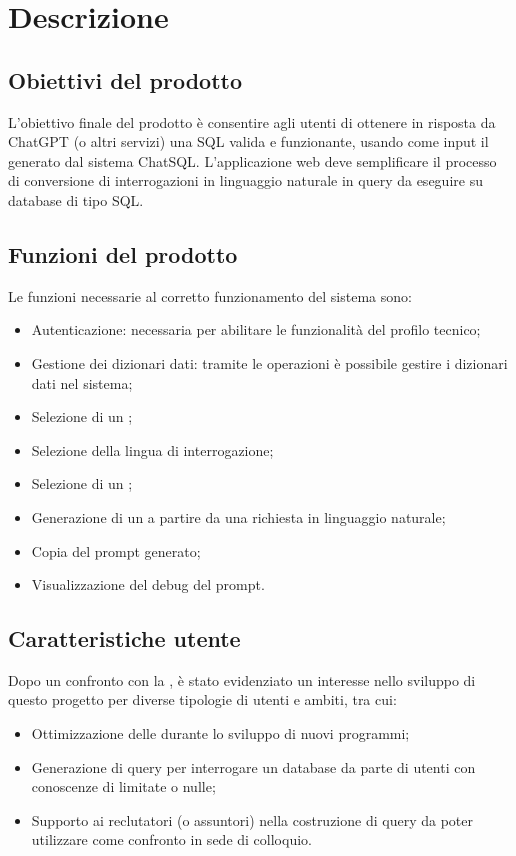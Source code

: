 \section{Descrizione}

\subsection{Obiettivi del prodotto}
\par L’obiettivo finale del prodotto è consentire agli utenti di ottenere in risposta da ChatGPT (o altri servizi) una  SQL valida e funzionante, usando come input il  generato dal sistema ChatSQL. L’applicazione web deve semplificare il processo di conversione di interrogazioni in linguaggio naturale in query da eseguire su database di tipo SQL.

\subsection{Funzioni del prodotto}
\par Le funzioni necessarie al corretto funzionamento del sistema sono:
\begin{itemize}
  \item Autenticazione: necessaria per abilitare le funzionalità del profilo tecnico;
  \item Gestione dei dizionari dati: tramite le operazioni  è possibile gestire i dizionari dati nel sistema;
  \item Selezione di un ;
  \item Selezione della lingua di interrogazione;
  \item Selezione di un ;
  \item Generazione di un  a partire da una richiesta in linguaggio naturale;
  \item Copia del prompt generato;
  \item Visualizzazione del debug del prompt.
\end{itemize}

\subsection{Caratteristiche utente}
Dopo un confronto con la , è stato evidenziato un interesse nello sviluppo di questo progetto per diverse tipologie di utenti e ambiti, tra cui:
\begin{itemize}
  \item Ottimizzazione delle  durante lo sviluppo di nuovi programmi;
  \item Generazione di query per interrogare un database da parte di utenti con conoscenze di  limitate o nulle;
  \item Supporto ai reclutatori (o assuntori) nella costruzione di query da poter utilizzare come confronto in sede di colloquio.
\end{itemize}